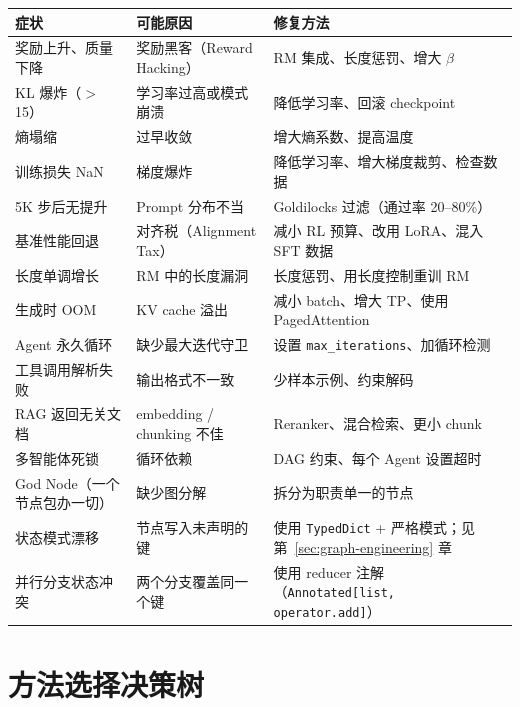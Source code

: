 \noindent\begin{tabularx}{\linewidth}{@{}Z{0.64} Z{0.9} Z{1.46}@{}}
\toprule
\textbf{症状} & \textbf{可能原因} & \textbf{修复方法} \\
\midrule
奖励上升、质量下降 & 奖励黑客（Reward Hacking） & RM 集成、长度惩罚、增大 $\beta$ \\
KL 爆炸（$>$15） & 学习率过高或模式崩溃 & 降低学习率、回滚 checkpoint \\
熵塌缩 & 过早收敛 & 增大熵系数、提高温度 \\
训练损失 NaN & 梯度爆炸 & 降低学习率、增大梯度裁剪、检查数据 \\
5K 步后无提升 & Prompt 分布不当 & Goldilocks 过滤（通过率 20--80\%） \\
基准性能回退 & 对齐税（Alignment Tax） & 减小 RL 预算、改用 LoRA、混入 SFT 数据 \\
长度单调增长 & RM 中的长度漏洞 & 长度惩罚、用长度控制重训 RM \\
生成时 OOM & KV cache 溢出 & 减小 batch、增大 TP、使用 PagedAttention \\
Agent 永久循环 & 缺少最大迭代守卫 & 设置 \texttt{max\_iterations}、加循环检测 \\
工具调用解析失败 & 输出格式不一致 & 少样本示例、约束解码 \\
RAG 返回无关文档 & embedding / chunking 不佳 & Reranker、混合检索、更小 chunk \\
多智能体死锁 & 循环依赖 & DAG 约束、每个 Agent 设置超时 \\
God Node（一个节点包办一切） & 缺少图分解 & 拆分为职责单一的节点 \\
状态模式漂移 & 节点写入未声明的键 & 使用 \texttt{TypedDict} + 严格模式；见第~\ref{sec:graph-engineering} 章 \\
并行分支状态冲突 & 两个分支覆盖同一个键 & 使用 reducer 注解（\texttt{Annotated[list, operator.add]}） \\
\bottomrule
\end{tabularx}

\section{方法选择决策树}
\label{method-selection-decision-tree}

